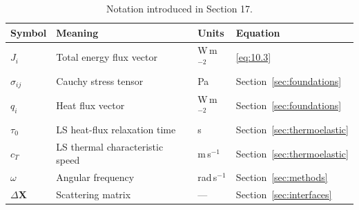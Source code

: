 \begin{table}[htbp]
\centering
\small
\caption{Notation introduced in Section 17.}
\label{tab:notation-sec17}
\begin{tabularx}{\textwidth}{@{}p{1.8cm}X p{2.2cm}p{2.1cm}@{}}
\toprule
\textbf{Symbol} & \textbf{Meaning} & \textbf{Units} & \textbf{Equation} \\
\midrule
$J_i$ & Total energy flux vector & W\,m$^{-2}$ & \eqref{eq:10.3} \\
$\sigma_{ij}$ & Cauchy stress tensor & Pa & Section~\ref{sec:foundations} \\
$q_i$ & Heat flux vector & W\,m$^{-2}$ & Section~\ref{sec:foundations} \\
$\tau_0$ & LS heat-flux relaxation time & s & Section~\ref{sec:thermoelastic} \\
$c_T$ & LS thermal characteristic speed & m\,s$^{-1}$ & Section~\ref{sec:thermoelastic} \\
$\omega$ & Angular frequency & rad\,s$^{-1}$ & Section~\ref{sec:methods} \\
$\Delta\bm{X}$ & Scattering matrix & --- & Section~\ref{sec:interfaces} \\
\bottomrule
\end{tabularx}
\end{table}
